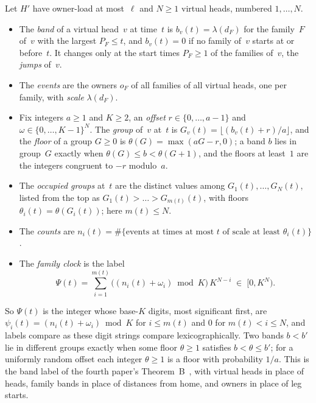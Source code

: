 \begin{definition}\label{def:clock}
Let $H'$ have owner-load at most~$\ell$ and $N\ge1$ virtual heads, numbered $1,\dots,N$.
\begin{itemize}[leftmargin=2em]
\item The \emph{band} of a virtual head~$v$ at time~$t$ is $b_v(t)=\lambda(d_F)$ for the family~$F$ of~$v$ with the
largest $P_F\le t$, and $b_v(t)=0$ if no family of~$v$ starts at or before~$t$. It changes only at the start times
$P_F\ge1$ of the families of~$v$, the \emph{jumps} of~$v$.
\item The \emph{events} are the owners $o_F$ of all families of all virtual heads, one per family, with \emph{scale}
$\lambda(d_F)$.
\item Fix integers $a\ge1$ and $K\ge2$, an \emph{offset} $r\in\{0,\dots,a-1\}$ and $\omega\in\{0,\dots,K-1\}^N$. The
\emph{group} of~$v$ at~$t$ is $G_v(t)=\lfloor(b_v(t)+r)/a\rfloor$, and the \emph{floor} of a group $G\ge0$ is
$\theta(G)=\max(aG-r,0)$; a band $b$ lies in group~$G$ exactly when $\theta(G)\le b<\theta(G+1)$, and the floors at
least~$1$ are the integers congruent to $-r$ modulo~$a$.
\item The \emph{occupied groups} at~$t$ are the distinct values among $G_1(t),\dots,G_N(t)$, listed from the top as
$G_1(t)>\dots>G_{m(t)}(t)$, with floors $\theta_i(t)=\theta(G_i(t))$; here $m(t)\le N$.
\item The \emph{counts} are $n_i(t)=\#\{\text{events at times at most }t\text{ of scale at least }\theta_i(t)\}$.
\item The \emph{family clock} is the label
\[
  \Psi(t)=\sum_{i=1}^{m(t)}\bigl((n_i(t)+\omega_i)\bmod K\bigr)\,K^{N-i}\;\in\;[0,K^N).
\]
\end{itemize}
\end{definition}

So $\Psi(t)$ is the integer whose base-$K$ digits, most significant first, are $\psi_i(t)=(n_i(t)+\omega_i)\bmod K$ for
$i\le m(t)$ and $0$ for $m(t)<i\le N$, and labels compare as these digit strings compare lexicographically. Two bands
$b<b'$ lie in different groups exactly when some floor $\theta\ge1$ satisfies $b<\theta\le b'$; for a
uniformly random offset each integer $\theta\ge1$ is a floor with probability $1/a$. This is the band label of the fourth
paper's Theorem~B~\cite[Definition~4.19]{FourthPaper2026}, with virtual heads in place of heads, family bands in place of
distances from home, and owners in place of leg starts.

